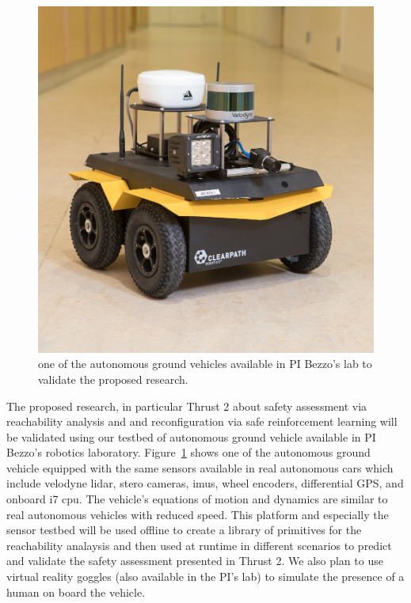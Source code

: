 \begin{figure}
\vspace{-5pt}
\centering
\includegraphics[width = \linewidth ]{figures/jackal_2.jpg} 
\caption{one of the autonomous ground vehicles available in PI Bezzo's lab to validate the proposed research.}
\vspace{-5pt}
\label{fig:jackal}\end{figure}
The proposed research, in particular Thrust 2 about safety assessment via reachability analysis and and reconfiguration via safe reinforcement learning will be validated using our testbed of autonomous ground vehicle available in PI Bezzo's robotics laboratory. Figure~\ref{fig:jackal} shows one of the autonomous ground vehicle equipped with the same sensors available in real autonomous cars which include velodyne lidar, stero cameras, imus, wheel encoders, differential GPS, and onboard i7 cpu. The vehicle's equations of motion and dynamics are similar to real autonomous vehicles with reduced speed. This platform and especially the sensor testbed will be used offline to create a library of primitives for the reachability analaysis and then used at runtime in different scenarios to predict and validate the safety assessment presented in Thrust 2. We also plan to use virtual reality goggles (also available in the PI's lab) to simulate the presence of a human on board the vehicle. 



